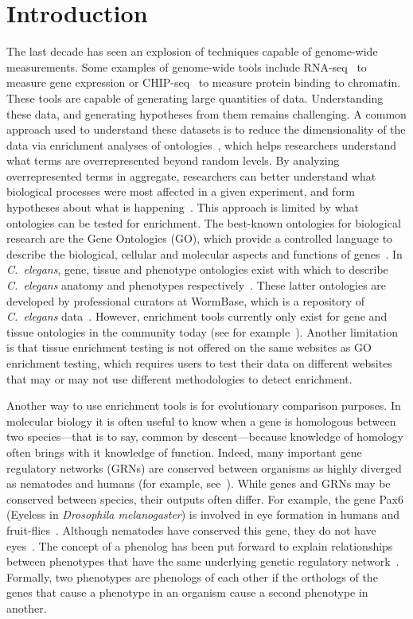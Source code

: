 \documentclass[10pt, onecolumn]{article}
\newcommand{\cel}{\emph{C.~elegans}}
\begin{document}
\section*{Introduction}
The last decade has seen an explosion of techniques capable of genome-wide
measurements. Some examples of genome-wide tools include
RNA-seq~\cite{Mortazavi2008} to measure gene expression or
CHIP-seq~\cite{Johnson2007} to measure protein binding to chromatin. These tools
are capable of generating large quantities of data. Understanding these data,
and generating hypotheses from them remains challenging. A common approach used
to understand these datasets is to reduce the dimensionality of the data via
enrichment analyses of ontologies~\cite{TheGeneOntologyConsortium2000a}, which
helps researchers understand what terms are overrepresented beyond random
levels. By analyzing overrepresented terms in aggregate, researchers can better
understand what biological processes were most affected in a given experiment,
and form hypotheses about what is happening~\cite{Rhee2008}. This approach is
limited by what ontologies can be tested for enrichment. The best-known ontologies
for biological research are the Gene Ontologies (GO), which provide a controlled
language to describe the biological, cellular and molecular aspects and functions of
genes~\cite{TheGeneOntologyConsortium2000a}. In \cel{}, gene, tissue and
phenotype ontologies exist with which to describe \cel{} anatomy and phenotypes
respectively~\cite{Schindelman2011,Lee2003}. These latter ontologies are developed by
professional curators at WormBase, which is a repository of \cel{}
data~\cite{Howe2016}. However, enrichment tools currently only exist for gene and tissue
ontologies in the community today (see for
example~\cite{Chikina2009,Mi2013,Angeles-Albores2016}). Another limitation is
that tissue enrichment testing is not offered on the same websites as GO
enrichment testing, which requires users to test their data on different
websites that may or may not use different methodologies to detect enrichment.

Another way to use enrichment tools is for evolutionary comparison purposes.
In molecular biology it is often useful to know when a gene is homologous
between two species---that is to say, common by descent---because knowledge of
homology often brings with it knowledge of function. Indeed, many
important gene regulatory networks (GRNs) are conserved between organisms as
highly diverged as nematodes and humans (for example, see~\cite{Sternberg1998}).
While genes and GRNs may be conserved between species, their outputs often differ.
For example, the gene Pax6 (Eyeless in \emph{Drosophila melanogaster})
is involved in eye formation in humans and fruit-flies~\cite{Quiring1994}. Although
nematodes have conserved this gene, they do not have eyes~\cite{Zhang1995,Chisholm1995}.
The concept of a phenolog has been put forward to explain relationships between
phenotypes that have the same underlying genetic
regulatory network~\cite{McGary2010,Lehner2013}.
Formally, two phenotypes are phenologs of each other if the orthologs of the
genes that cause a phenotype in an organism cause a second phenotype in another.
\end{document}
